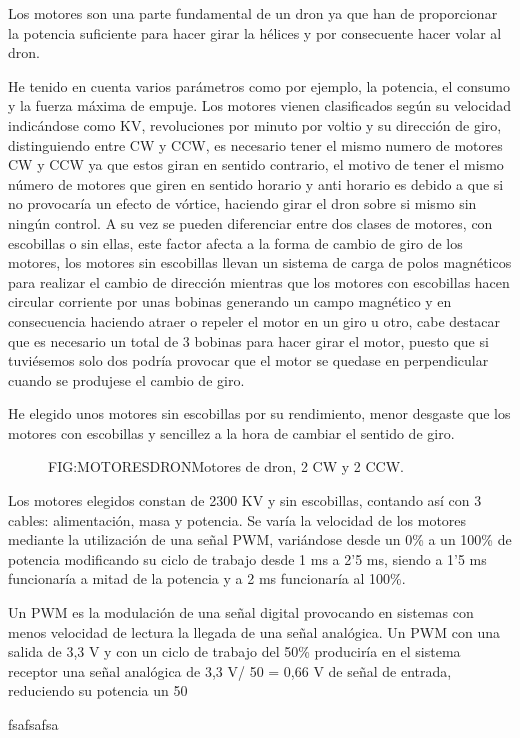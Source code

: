
Los motores son una parte fundamental de un dron ya que han de proporcionar la potencia suficiente para hacer girar la hélices y por consecuente hacer volar al dron. 
                
 He tenido en cuenta varios parámetros como por ejemplo, la potencia, el consumo y la fuerza máxima de empuje. Los motores vienen clasificados según su velocidad indicándose como KV, revoluciones por minuto por voltio y su dirección de giro, distinguiendo entre CW y CCW, es necesario tener el mismo numero de motores CW y CCW ya que estos giran en sentido contrario, el motivo de tener el mismo número de motores que giren en sentido horario y anti horario es debido a que si no provocaría un efecto de vórtice, haciendo girar el dron sobre si mismo sin ningún control. A su vez se pueden diferenciar entre dos clases de motores, con escobillas o sin ellas, este factor afecta a la forma de cambio de giro de los motores, los motores sin escobillas llevan un sistema de carga de polos magnéticos para realizar el cambio de dirección mientras que los motores con escobillas hacen circular corriente por unas bobinas generando un campo magnético y en consecuencia haciendo atraer o repeler el motor en un giro u otro, cabe destacar que es necesario un total de 3 bobinas para hacer girar el motor, puesto que si tuviésemos solo dos podría provocar que el motor se quedase en perpendicular cuando se produjese el cambio de giro.
                
 He elegido unos motores sin escobillas por su rendimiento, menor desgaste que los motores con escobillas y sencillez a la hora de cambiar el sentido de giro. 
 
 \begin{figure}{FIG:MOTORESDRON}{Motores de dron, 2 CW y 2 CCW.}
\end{figure}
                
 Los motores elegidos constan de 2300 KV y sin escobillas, contando así con 3 cables: alimentación, masa y potencia. Se varía la velocidad de los motores mediante la utilización de una señal PWM, variándose desde un 0\% a un 100\% de potencia modificando su ciclo de trabajo desde 1 ms a 2'5 ms, siendo a 1'5 ms funcionaría a mitad de la potencia y a 2 ms funcionaría al 100\%.
 
 Un PWM es la modulación de una señal digital provocando en sistemas con menos velocidad de lectura la llegada de una señal analógica. Un PWM con una salida de 3,3 V y con un ciclo de trabajo del 50\% produciría en el sistema receptor una señal analógica de 3,3 V/ 50 = 0,66 V de señal de entrada, reduciendo su potencia un 50%
 

 fsafsafsa